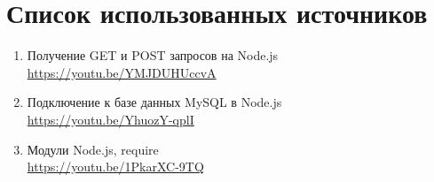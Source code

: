 \newpage

\section*{Список использованных источников}

\begin{enumerate}
    \item Получение GET и POST запросов на Node.js \\
    \url{https://youtu.be/YMJDUHUccvA}

    \item Подключение к базе данных MySQL в Node.js \\
    \url{https://youtu.be/YhuozY-qplI}

    \item Модули Node.js, require \\
    \url{https://youtu.be/1PkarXC-9TQ}
\end{enumerate}
